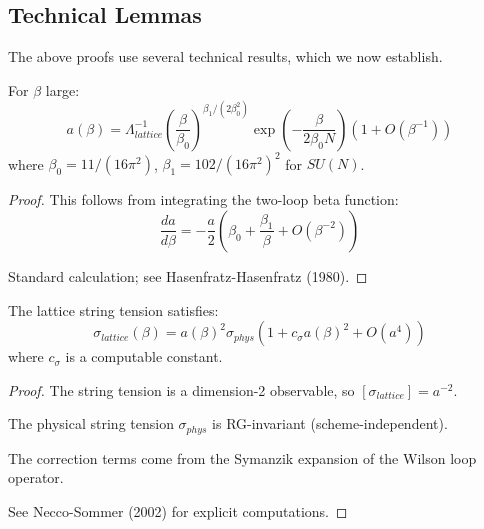 \subsection{Technical Lemmas}

The above proofs use several technical results, which we now establish.

\begin{lemma}
\label{lem:lattice-spacing}
For $\beta$ large:
\begin{equation}
a(\beta) = \Lambda_{lattice}^{-1} \left( \frac{\beta}{\beta_0} \right)^{\beta_1/(2\beta_0^2)} 
\exp\left( -\frac{\beta}{2\beta_0 N} \right) \left( 1 + O(\beta^{-1}) \right)
\end{equation}
where $\beta_0 = 11/(16\pi^2)$, $\beta_1 = 102/(16\pi^2)^2$ for $SU(N)$.
\end{lemma}

\begin{proof}
This follows from integrating the two-loop beta function:
\begin{equation}
\frac{da}{d\beta} = -\frac{a}{2} \left( \beta_0 + \frac{\beta_1}{\beta} + O(\beta^{-2}) \right)
\end{equation}

Standard calculation; see Hasenfratz-Hasenfratz (1980).
\end{proof}

\begin{lemma}
\label{lem:sigma-scaling}
The lattice string tension satisfies:
\begin{equation}
\sigma_{lattice}(\beta) = a(\beta)^2 \sigma_{phys} \left( 1 + c_\sigma a(\beta)^2 + O(a^4) \right)
\end{equation}
where $c_\sigma$ is a computable constant.
\end{lemma}

\begin{proof}
The string tension is a dimension-2 observable, so $[\sigma_{lattice}] = a^{-2}$.

The physical string tension $\sigma_{phys}$ is RG-invariant (scheme-independent).

The correction terms come from the Symanzik expansion of the Wilson loop operator.

See Necco-Sommer (2002) for explicit computations.
\end{proof}

